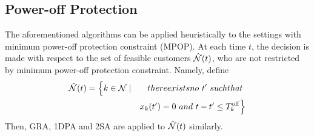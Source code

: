 
\vspace{-5pt} 
\subsection{Power-off Protection}

The aforementioned algorithms can be applied heuristically to the settings with minimum power-off protection constraint ({\sc MPOP}). At each time $t$, the decision is made with respect to the set of feasible customers $\hat{\cal N}(t)$, who are not restricted by minimum power-off protection constraint. Namely, define \vspace{-5pt} 
\begin{eqnarray}
\hat{\cal N}(t) = \Big\{ k \in {\cal N}& \mid & \mbox{there exists no\ } t' \mbox{\ such that\ } \notag \\
 & & x_k(t')=0 \mbox{\ and\ } t - t' \le  T^{\rm off}_k \Big\}
\end{eqnarray} 
Then, {\sc GRA}, {\sc 1DPA} and {\sc 2SA} are applied to $\hat{\cal N}(t)$ similarly.